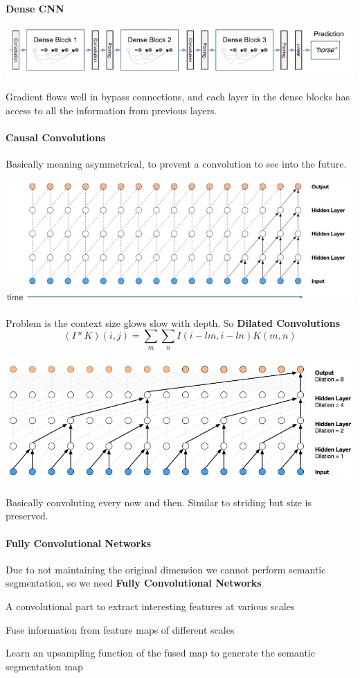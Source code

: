 \documentclass[10pt]{report}
\begin{document}
\paragraph{Dense CNN}
\begin{center}
	\includegraphics[scale=0.5]{69.png}
\end{center}
Gradient flows well in bypass connections, and each layer in the dense blocks has access to all the information from previous layers.
\paragraph{Causal Convolutions} Basically meaning asymmetrical, to prevent a convolution to see into the future.\begin{center}
	\includegraphics[scale=0.5]{70.png}
\end{center}
Problem is the context size glows slow with depth. So \textbf{Dilated Convolutions}
$$(I*K)(i,j)=\sum_m\sum_nI(i-lm,i-ln)K(m,n)$$
\begin{center}
	\includegraphics[scale=0.5]{71.png}
\end{center}
Basically convoluting every now and then. Similar to striding but size is preserved.
\paragraph{Fully Convolutional Networks} Due to not maintaining the original dimension we cannot perform semantic segmentation, so we need \textbf{Fully Convolutional Networks}
\begin{list}{}{}
	\item A convolutional part to extract interesting features at various scales
	\item Fuse information from feature maps of different scales
	\item Learn an upsampling function of the fused map to generate the semantic segmentation map
\end{list}
\pagebreak
\end{document}
